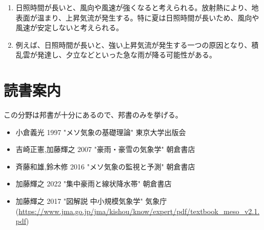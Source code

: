 \documentclass{jsarticle}
\newenvironment{problems}
{
  \renewcommand\labelenumi{\doublebox{\arabic{enumi}}}
  \begin{enumerate}
}{
  \end{enumerate}
  \renewcommand\labelenumi{\arabic{enumi}.}
}
\begin{document}
\begin{problems}
\begin{enumerate}[(1)]
        \item 日照時間が長いと、風向や風速が強くなると考えられる。放射熱により、地表面が温まり、上昇気流が発生する。特に夏は日照時間が長いため、風向や風速が安定しないと考えられる。
        \item 例えば、日照時間が長いと、強い上昇気流が発生する一つの原因となり、積乱雲が発達し、夕立などといった急な雨が降る可能性がある。
        \end{enumerate}
\end{problems}

\section{読書案内}
この分野は邦書が十分にあるので、邦書のみを挙げる。
\begin{itemize}
\item 小倉義光 1997 "メソ気象の基礎理論" 東京大学出版会
\item 吉崎正憲,加藤輝之 2007 "豪雨・豪雪の気象学" 朝倉書店
\item 斉藤和雄,鈴木修 2016 "メソ気象の監視と予測" 朝倉書店
\item 加藤輝之 2022 "集中豪雨と線状降水帯" 朝倉書店
\item 加藤輝之 2017 "図解説 中小規模気象学" 気象庁 (\url{https://www.jma.go.jp/jma/kishou/know/expert/pdf/textbook_meso_v2.1.pdf})
\end{itemize}
\end{document}
